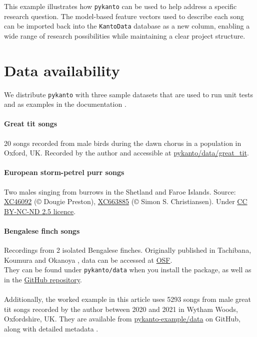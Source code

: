 This example illustrates how \texttt{pykanto} can be used to help address a
specific research question. The model-based feature vectors used to describe each song
can be imported back into the \texttt{KantoData} database as a new column, enabling a
wide range of research possibilities while maintaining a clear project
structure.

\section{Data availability}

We distribute \texttt{pykanto} with three sample datasets that are used to run unit tests
and as examples in the documentation \parencite{nilo_pykanto_2023}.

\paragraph{Great tit songs} 20 songs recorded from male birds during the dawn chorus in a
population in Oxford, UK. Recorded by the author and accessible at \href{https://github.com/nilomr/pykanto/tree/main/pykanto/data/segmented/great_tit}{pykanto/data/great\_tit}.

\paragraph{European storm-petrel purr songs} Two males singing from burrows in the Shetland
and Faroe Islands. Source: \href{https://xeno-canto.org/46092}{XC46092} (©
Dougie Preston), \href{https://xeno-canto.org/663885}{XC663885} (© Simon S.
Christiansen). Under
\href{https://creativecommons.org/licenses/by-nc-nd/2.5/}{CC BY-NC-ND 2.5
licence}.

\paragraph{Bengalese finch songs} Recordings from 2 isolated Bengalese finches. Originally
published in Tachibana, Koumura and Okanoya \parencite{tachibana2015}, data can be
accessed at \href{https://osf.io/r6paq/}{OSF}.\\[.2cm]

\noindent They can be found under \texttt{pykanto/data} when you install the package, as well as in the \href{https://github.com/nilomr/pykanto}{GitHub repository}.

\paragraph{}Additionally, the worked example in this article uses 5293 songs from male great tit songs recorded by the author between 2020 and 2021 in Wytham Woods, Oxfordshire, UK. They are available from \href{https://github.com/nilomr/pykanto-example/tree/main/data/segmented/pykanto-example}{pykanto-example/data} on GitHub, along with detailed metadata \parencite{nilo_pykanto_example_2023}.


